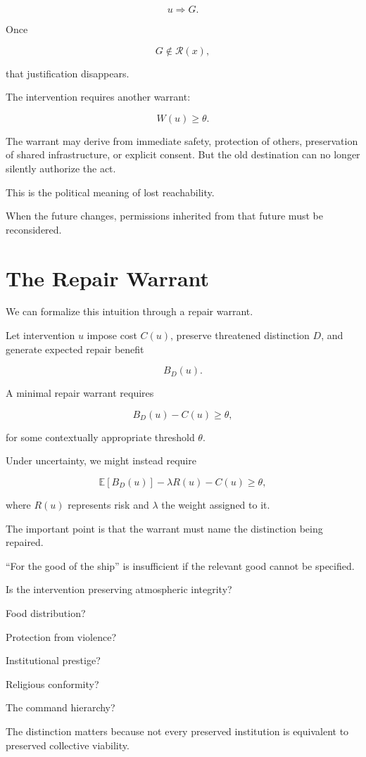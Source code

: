 \documentclass[11pt,oneside]{book}
\theoremstyle{definition}
\theoremstyle{remark}
\newcommand{\R}{\mathcal{R}}
\begin{document}
\[
u
\Rightarrow
G.
\]

Once

\[
G\notin\R(x),
\]

that justification disappears.

The intervention requires another warrant:

\[
W(u)\geq\theta.
\]

The warrant may derive from immediate safety, protection of others, preservation of shared infrastructure, or explicit consent. But the old destination can no longer silently authorize the act.

This is the political meaning of lost reachability.

When the future changes, permissions inherited from that future must be reconsidered.

\section{The Repair Warrant}

We can formalize this intuition through a repair warrant.

Let intervention \(u\) impose cost \(C(u)\), preserve threatened distinction \(D\), and generate expected repair benefit

\[
B_D(u).
\]

A minimal repair warrant requires

\[
B_D(u)-C(u)\geq\theta,
\]

for some contextually appropriate threshold \(\theta\).

Under uncertainty, we might instead require

\[
\mathbb E[B_D(u)]
-
\lambda R(u)
-
C(u)
\geq
\theta,
\]

where \(R(u)\) represents risk and \(\lambda\) the weight assigned to it.

The important point is that the warrant must name the distinction being repaired.

``For the good of the ship'' is insufficient if the relevant good cannot be specified.

Is the intervention preserving atmospheric integrity?

Food distribution?

Protection from violence?

Institutional prestige?

Religious conformity?

The command hierarchy?

The distinction matters because not every preserved institution is equivalent to preserved collective viability.
\end{document}

